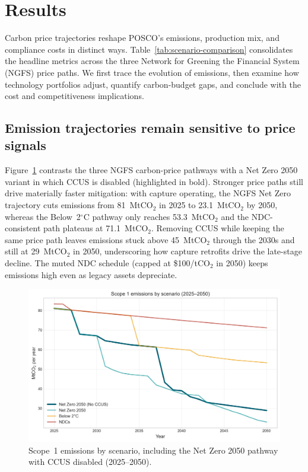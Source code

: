 \documentclass[preprint,1p,authoryear]{elsarticle}
\begin{document}




\section{Results}

Carbon price trajectories reshape POSCO's emissions, production mix, and compliance costs in distinct ways. Table~\ref{tab:scenario-comparison} consolidates the headline metrics across the three Network for Greening the Financial System (NGFS) price paths. We first trace the evolution of emissions, then examine how technology portfolios adjust, quantify carbon-budget gaps, and conclude with the cost and competitiveness implications.

\subsection{Emission trajectories remain sensitive to price signals}

Figure~\ref{fig:scope1-by-scenario} contrasts the three NGFS carbon-price pathways with a Net Zero 2050 variant in which CCUS is disabled (highlighted in bold). Stronger price paths still drive materially faster mitigation: with capture operating, the NGFS Net Zero trajectory cuts emissions from 81~MtCO$_2$ in 2025 to 23.1~MtCO$_2$ by 2050, whereas the Below~2$^\circ$C pathway only reaches 53.3~MtCO$_2$ and the NDC-consistent path plateaus at 71.1~MtCO$_2$. Removing CCUS while keeping the same price path leaves emissions stuck above 45~MtCO$_2$ through the 2030s and still at 29~MtCO$_2$ in 2050, underscoring how capture retrofits drive the late-stage decline. The muted NDC schedule (capped at \$100/tCO$_2$ in 2050) keeps emissions high even as legacy assets depreciate.

\begin{figure}[!t]
  \centering
  \includegraphics[width=0.8\linewidth]{scope1_by_scenario}
  \caption{Scope~1 emissions by scenario, including the Net Zero 2050 pathway with CCUS disabled (2025--2050).}
  \label{fig:scope1-by-scenario}
\end{figure}
\end{document}
